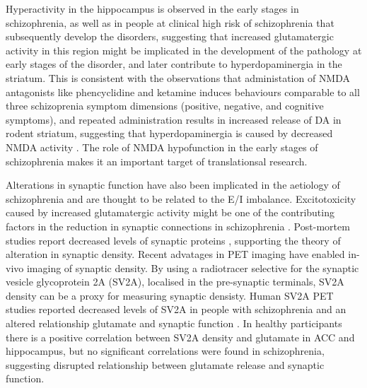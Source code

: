\documentclass[
  letterpaper,
  DIV=11,
  numbers=noendperiod]{scrartcl}
\begin{document}
Hyperactivity in the hippocampus is observed in the early stages in
schizophrenia, as well as in people at clinical high risk of
schizophrenia that subsequently develop the disorders, suggesting that
increased glutamatergic activity in this region might be implicated in
the development of the pathology at early stages of the disorder, and
later contribute to hyperdopaminergia in the striatum. This is
consistent with the observations that administation of {NMDA}
antagonists like phencyclidine and ketamine induces behaviours
comparable to all three schizoprenia symptom dimensions (positive,
negative, and cognitive symptoms)\autocite{beck_association_2020}, and
repeated administration results in increased release of {DA} in rodent
striatum\autocite{balla_continuous_2001}, suggesting that
hyperdopaminergia is caused by decreased {NMDA} activity
\autocite{grace_dopamine_2012,grace_dysregulation_2016}. The role of
NMDA hypofunction in the early stages of schizophrenia makes it an
important target of translationsal research.

Alterations in synaptic function have also been implicated in the
aetiology of schizophrenia \autocite{howes_synaptic_2023} and are
thought to be related to the E/I imbalance. Excitotoxicity caused by
increased glutamatergic activity might be one of the contributing
factors in the reduction in synaptic connections in schizophrenia
\autocite{glantz_apoptotic_2006}. Post-mortem studies report decreased
levels of synaptic proteins \autocite{osimo_synaptic_2019}, supporting
the theory of alteration in synaptic density. Recent advatages in PET
imaging have enabled in-vivo imaging of synaptic density. By using a
radiotracer selective for the synaptic vesicle glycoprotein 2A (SV2A),
localised in the pre-synaptic terminals, SV2A density can be a proxy for
measuring synaptic densisty. Human SV2A PET studies reported decreased
levels of SV2A in people with schizophrenia
\autocite{radhakrishnan_vivo_2021,onwordi_synaptic_2020} and an altered
relationship glutamate and synaptic function
\autocite{onwordi_relationship_2021}. In healthy participants there is a
positive correlation between SV2A density and glutamate in ACC and
hippocampus, but no significant correlations were found in
schizophrenia\autocite{onwordi_relationship_2021}, suggesting disrupted
relationship between glutamate release and synaptic function.
\end{document}
